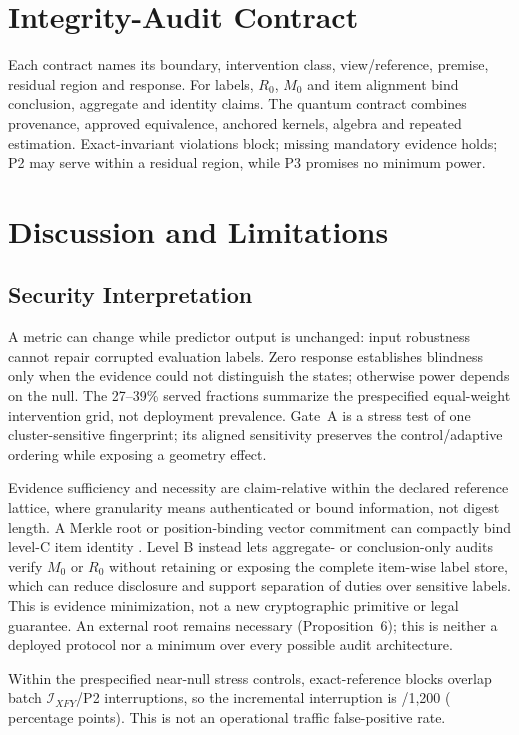 \documentclass[10pt,journal,compsoc]{IEEEtran}
\newcommand{\IXFY}{\mathcal I_{XFY}}
\begin{document}
\section{Integrity-Audit Contract}

Each contract names its boundary, intervention class, view/reference, premise,
residual region and response. For labels, $R_0$, $M_0$ and item alignment bind
conclusion, aggregate and identity claims. The quantum contract combines
provenance, approved equivalence, anchored kernels, algebra and repeated
estimation. Exact-invariant violations block; missing mandatory evidence holds;
P2 may serve within a residual region, while P3 promises no minimum power.

\section{Discussion and Limitations}

\subsection{Security Interpretation}

A metric can change while predictor output is unchanged: input robustness
cannot repair corrupted evaluation labels. Zero response establishes blindness
only when the evidence could not distinguish the states; otherwise power
depends on the null. The 27--39\% served fractions summarize the prespecified
equal-weight intervention grid, not deployment prevalence. Gate~A is a stress
test of one cluster-sensitive fingerprint; its aligned sensitivity preserves
the control/adaptive ordering while exposing a geometry effect.

Evidence sufficiency and necessity are claim-relative within the declared
reference lattice, where granularity means authenticated or bound information,
not digest length. A Merkle root or
position-binding vector commitment can compactly bind level-C item identity
\cite{Merkle1988,CatalanoFiore2013}. Level B instead lets aggregate- or
conclusion-only audits verify $M_0$ or $R_0$ without retaining or exposing the
complete item-wise label store, which can reduce disclosure and support
separation of duties over sensitive labels. This is evidence minimization, not
a new cryptographic primitive or legal guarantee. An external root remains
necessary (Proposition~6); this is neither a deployed protocol nor a minimum
over every possible audit architecture.

Within the prespecified near-null stress controls,
\TrustedGrossExactBlocks{} exact-reference blocks overlap
\TrustedExactOverlap{} batch $\IXFY$/P2 interruptions, so the incremental
interruption is \TrustedNetAdditional{}/1,200
(\TrustedNetAdditionalPct{} percentage points). This is not an operational
traffic false-positive rate.
\end{document}
